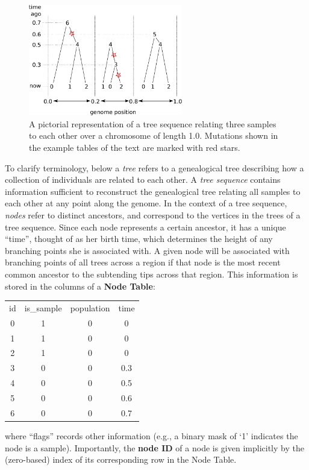 \documentclass{article}
\begin{document}
\begin{figure}
    \begin{center}
        \includegraphics[width=0.6\textwidth]{example_tree_seq}
    \end{center}
    \caption{
        A pictorial representation of a tree sequence
        relating three samples to each other
        over a chromosome of length 1.0.
        Mutations shown in the example tables of the text
        are marked with red stars.
        \label{fig:ex_tree_seq}
    }
\end{figure}

To clarify terminology,
below a \emph{tree} refers to
a genealogical tree describing how a collection of individuals are related to each other.
A \emph{tree sequence} contains information sufficient to reconstruct the genealogical
tree relating all samples to each other at any point along the genome.
In the context of a tree sequence, \emph{nodes} refer to distinct ancestors,
and correspond to the vertices in the trees of a tree sequence.
Since each node represents a certain ancestor, it has a unique ``time'', thought of as her birth time,
which determines the height of any branching points she is associated with.  A given node will be
associated with branching points of all trees across a region if that node
is the most recent common ancestor to the subtending tips across that region.
This information is stored in the columns of a \textbf{Node Table}:
\begin{center}
\begin{tabular}{cccc}
    id   &  is\_sample &  population &  time \\
    0    &  1          & 0           & 0 \\
    1    &  1          & 0           & 0 \\
    2    &  1          & 0           & 0 \\
    3    &  0          & 0           & 0.3 \\
    4    &  0          & 0           & 0.5 \\
    5    &  0          & 0           & 0.6 \\
    6    &  0          & 0           & 0.7 \\
\end{tabular}
\end{center}
where ``flags'' records other information
(e.g., a binary mask of `1' indicates the node is a sample).
Importantly, the \textbf{node ID} of a node is given implicitly
by the (zero-based) index of its corresponding row in the Node Table.
\end{document}
